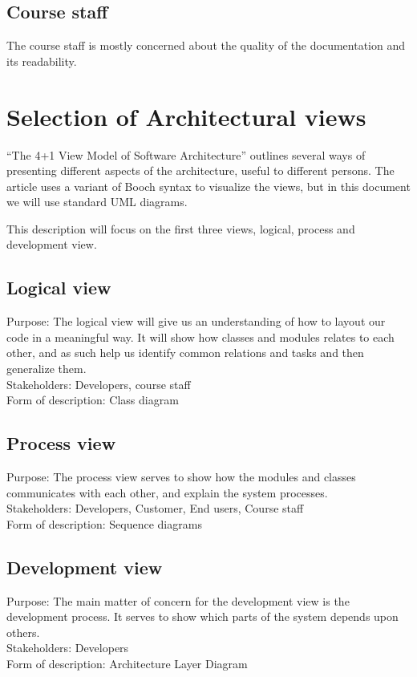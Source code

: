 \documentclass[11pt]{book}
\begin{document}
\subsection{Course staff}
The course staff is mostly concerned about the quality of the documentation and its readability.

\section{Selection of Architectural views}
``The 4+1 View Model of Software Architecture'' \cite{Kruchten:1995:VMA:624610.625529} outlines several ways of presenting different aspects of the architecture, useful to different persons. The article uses a variant of Booch syntax to visualize the views, but in this document we will use standard UML diagrams.

This description will focus on the first three views, logical, process and development view.

\subsection{Logical view}\label{subsec:logicalViewDescription}
Purpose: The logical view will give us an understanding of how to layout our code in a meaningful way. It will show how classes and modules relates to each other, and as such help us identify common relations and tasks and then generalize them.\\
Stakeholders: Developers, course staff\\
Form of description: Class diagram

\subsection{Process view}\label{subsec:processViewDescription}
Purpose: The process view serves to show how the modules and classes communicates with each other, and explain the system processes.\\
Stakeholders: Developers, Customer, End users, Course staff\\
Form of description: Sequence diagrams

\subsection{Development view}\label{subsec:developmentViewDescription}
Purpose: The main matter of concern for the development view is the development process. It serves to show which parts of the system depends upon others. \\
Stakeholders: Developers\\
Form of description: Architecture Layer Diagram
\end{document}
